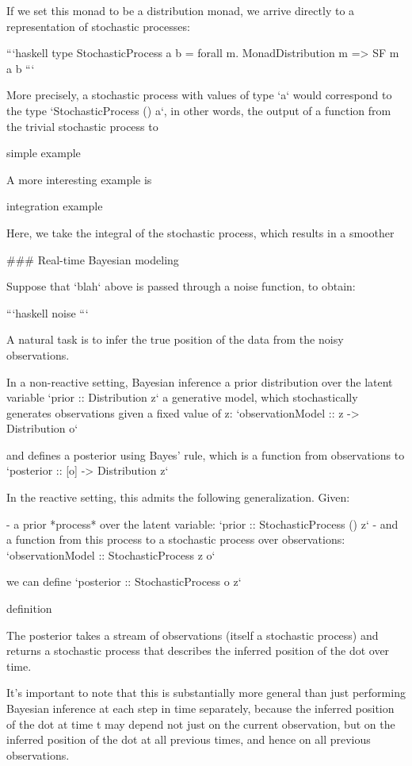 If we set this monad to be a distribution monad, we arrive directly to a representation of stochastic processes:

```haskell
type StochasticProcess a b = forall m. MonadDistribution m => SF m a b
```

More precisely, a stochastic process with values of type `a` would correspond to the type `StochasticProcess () a`, in other words, the output of a function from the trivial stochastic process to

simple example

A more interesting example is

integration example

Here, we take the integral of the stochastic process, which results in a smoother

### Real-time Bayesian modeling

Suppose that `blah` 
    above is passed through a noise function, to obtain:

```haskell
noise
```

A natural task is to infer the true position of the data from the noisy observations.

In a non-reactive setting, Bayesian inference 
    a prior distribution over the latent variable `prior :: Distribution z` 
    a generative model, which stochastically generates observations given a fixed value of z: `observationModel :: z -> Distribution o`

and defines a posterior using Bayes' rule, which is a function from observations to `posterior :: [o] -> Distribution z`

In the reactive setting, this admits the following generalization. Given:

- a prior *process* over the latent variable: `prior :: StochasticProcess () z`
- and a function from this process to a stochastic process over observations: `observationModel :: StochasticProcess z o`

we can define `posterior :: StochasticProcess o z`

definition 

The posterior takes a stream of observations (itself a stochastic process) and returns a stochastic process that describes the inferred position of the dot over time.

It's important to note that this is substantially more general than just performing Bayesian inference at each step in time separately, because the inferred position of the dot at time t may depend not just on the current observation, but on the inferred position of the dot at all previous times, and hence on all previous observations.

